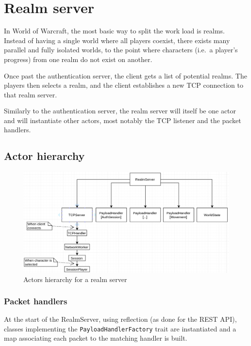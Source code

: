 \documentclass[paper=a4, fontsize=11pt]{scrartcl}
\begin{document}
\section{Realm server}

In World of Warcraft, the most basic way to split the work load is
realms.
Instead of having a single world where all players coexist, there exists many
parallel and fully isolated worlds, to the point where characters (i.e.\ a
player's progress) from one realm do not exist on another.

Once past the authentication server, the client gets a list of potential realms.
The players then selects a realm, and the client establishes a new TCP
connection to that realm server.

Similarly to the authentication server, the realm server will itself be one
actor and will instantiate other actors, most notably the TCP listener and the
packet handlers.


\subsection{Actor hierarchy}

\begin{figure}[htb!]
    \centering
    \includegraphics[width=\textwidth]{realmactors}
    \caption{Actors hierarchy for a realm server}
\end{figure}

\subsubsection{Packet handlers}

At the start of the RealmServer, using reflection (as done for the REST API),
classes implementing the \texttt{PayloadHandlerFactory} trait are instantiated
and a map associating each packet to the matching handler is built.
\end{document}
